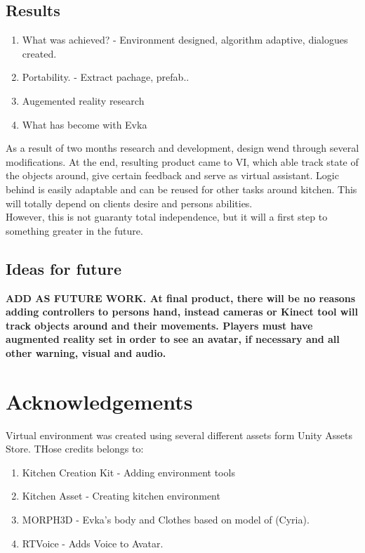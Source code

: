 \documentclass[18pt]{article}
\numberwithin{equation}{section} %
\numberwithin{figure}{section} %
\numberwithin{table}{section} %
\begin{document}
	\subsection{Results}
	\begin{enumerate}
		\item What was achieved? - Environment designed, algorithm adaptive, dialogues created.
		\item Portability. - Extract pachage, prefab..
		\item Augemented reality research
		\item What has become with Evka
	\end{enumerate}
	As a result of two months research and development, design wend through several modifications. At the end, resulting product came to VI, which able track state of the objects around, give certain feedback and serve as virtual assistant. Logic behind is easily adaptable and can be reused for other tasks around kitchen. This will totally depend on clients desire and persons abilities. \\
	
	However, this is not  guaranty total independence, but it will a first step to something greater in the future. \\
	\subsection{Ideas for future}
	
	\textbf{ ADD AS FUTURE WORK. At final product, there will be no reasons adding controllers to persons hand, instead cameras or Kinect tool will track objects around and their movements.  Players must have augmented reality set in order to see an avatar, if necessary and all other warning, visual and audio.\\}
	
\section{Acknowledgements}	
	Virtual environment was created using several different assets form Unity Assets Store. THose credits belongs to: 
	\begin{enumerate}
		\item Kitchen Creation Kit - Adding environment tools
		\item Kitchen Asset - Creating kitchen environment
		\item MORPH3D - Evka's body and Clothes based on model of (Cyria).
		\item RTVoice - Adds Voice to Avatar.
	\end{enumerate}
	
\end{document}
